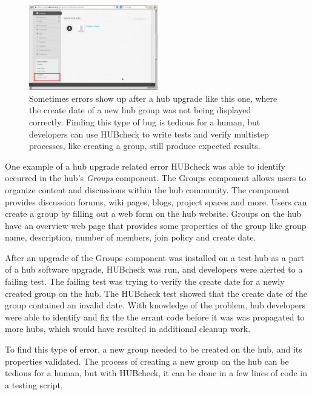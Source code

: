 \documentclass[letterpaper]{scrartcl}
\begin{document}
\begin{figure}[ht]
  \centering
  \includegraphics[width=0.5\textwidth]
    {../../images/eps/qahubzero_v1_2_group_create_date_bad_year.pdf}
  \caption{ Sometimes errors show up after a hub upgrade like this one, where
            the create date of a new hub group was not being displayed correctly.
            Finding this type of bug is tedious for a human, but developers
            can use HUBcheck to write tests and verify multistep processes,
            like creating a group, still produce expected results.}
  \label{fig:group_create_date_bad_year}
\end{figure}


One example of a hub upgrade related error HUBcheck was able to identify
occurred in the hub's \textit{Groups} component. The Groups component allows
users to organize content and discussions within the hub community. The
component provides discussion forums, wiki pages, blogs, project spaces and
more. Users can create a group by filling out a web form on the hub website.
Groups on the hub have an overview web page that provides some properties of the
group like group name, description, number of members, join policy and create
date.

After an upgrade of the Groups component was installed on a test hub as a part of
a hub software upgrade, HUBcheck was run, and developers were alerted to a
failing test.  The failing test was trying to verify the create date for a
newly created group on the hub. The HUBcheck test showed that the create date
of the group contained an invalid date. With knowledge of the problem, hub
developers were able to identify and fix the the errant code before it was was
propagated to more hubs, which would have resulted in additional cleanup work.

To find this type of error, a new group needed to be created on the hub, and
its properties validated. The process of creating a new group on the hub can be
tedious for a human, but with HUBcheck, it can be done in a few lines of code
in a testing script.
\end{document}
